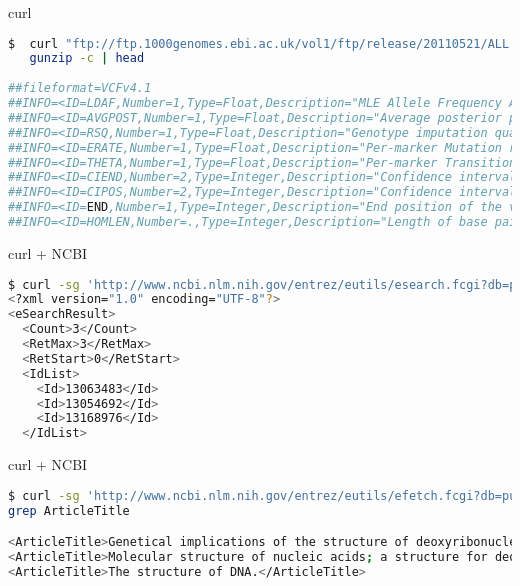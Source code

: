 \documentclass{beamer}
\begin{document}
\begin{frame}[fragile]
 \begin{center}
    \huge{curl}\\
    \end{center}
\begin{lstlisting}[language=bash,breaklines=true]
$  curl "ftp://ftp.1000genomes.ebi.ac.uk/vol1/ftp/release/20110521/ALL.wgs.phase1_release_v3.20101123.snps_indels_sv.sites.vcf.gz" |\
   gunzip -c | head
   
##fileformat=VCFv4.1
##INFO=<ID=LDAF,Number=1,Type=Float,Description="MLE Allele Frequency Accounting for LD">
##INFO=<ID=AVGPOST,Number=1,Type=Float,Description="Average posterior probability from MaCH/Thunder">
##INFO=<ID=RSQ,Number=1,Type=Float,Description="Genotype imputation quality from MaCH/Thunder">
##INFO=<ID=ERATE,Number=1,Type=Float,Description="Per-marker Mutation rate from MaCH/Thunder">
##INFO=<ID=THETA,Number=1,Type=Float,Description="Per-marker Transition rate from MaCH/Thunder">
##INFO=<ID=CIEND,Number=2,Type=Integer,Description="Confidence interval around END for imprecise variants">
##INFO=<ID=CIPOS,Number=2,Type=Integer,Description="Confidence interval around POS for imprecise variants">
##INFO=<ID=END,Number=1,Type=Integer,Description="End position of the variant described in this record">
##INFO=<ID=HOMLEN,Number=.,Type=Integer,Description="Length of base pair identical micro-homology at event breakpoints">
\end{lstlisting}
\end{frame}

\begin{frame}[fragile]
 \begin{center}
    \huge{curl + NCBI}\\
    \end{center}
\begin{lstlisting}[language=bash]
$ curl -sg 'http://www.ncbi.nlm.nih.gov/entrez/eutils/esearch.fcgi?db=pubmed&term=watson[AU]+crick[AU]+1953[Date+-+Publication]'  
<?xml version="1.0" encoding="UTF-8"?>
<eSearchResult>
  <Count>3</Count>
  <RetMax>3</RetMax>
  <RetStart>0</RetStart>
  <IdList>
    <Id>13063483</Id>
    <Id>13054692</Id>
    <Id>13168976</Id>
  </IdList>
 \end{lstlisting}
\end{frame} 


\begin{frame}[fragile]
 \begin{center}
    \huge{curl + NCBI}\\
    \end{center}
\begin{lstlisting}[language=bash,breaklines=true]
$ curl -sg 'http://www.ncbi.nlm.nih.gov/entrez/eutils/efetch.fcgi?db=pubmed&id=13063483,13054692,13168976&retmode=xml' |\
grep ArticleTitle

<ArticleTitle>Genetical implications of the structure of deoxyribonucleic acid.</ArticleTitle>
<ArticleTitle>Molecular structure of nucleic acids; a structure for deoxyribose nucleic acid.</ArticleTitle>
<ArticleTitle>The structure of DNA.</ArticleTitle>
 \end{lstlisting}
\end{frame} 
\end{document}
